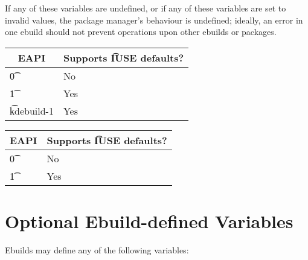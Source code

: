 If any of these variables are undefined, or if any of these variables are set to invalid values,
the package manager's behaviour is undefined; ideally, an error in one ebuild should not prevent
operations upon other ebuilds or packages.

\IFKDEBUILDELSE
{
    \begin{table}
    \centering
     \label{iuse-defaults-table}
    \begin{tabular}{ l l }
        \toprule
        \multicolumn{1}{c}{\textbf{EAPI}} &
        \multicolumn{1}{c}{\textbf{Supports \t{IUSE} defaults?}} \\
        \midrule
    \t{0} & No \\
    \t{1} & Yes \\
    \t{kdebuild-1} & Yes \\
    \bottomrule
    \end{tabular}
    \end{table}
}
{
    \begin{table}
    \centering
     \label{iuse-defaults-table}
    \begin{tabular}{ l l }
        \toprule
        \multicolumn{1}{c}{\textbf{EAPI}} &
        \multicolumn{1}{c}{\textbf{Supports \t{IUSE} defaults?}} \\
        \midrule
    \t{0} & No \\
    \t{1} & Yes \\
    \bottomrule
    \end{tabular}
    \end{table}
}

\section{Optional Ebuild-defined Variables}

Ebuilds may define any of the following variables:

